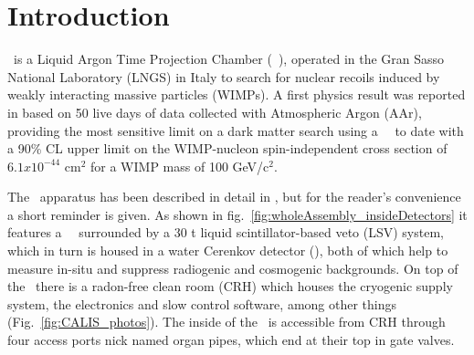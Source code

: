 \section{Introduction}\label{sec:intro}\label{sec:introduction}

\dsf\ is a Liquid Argon Time Projection Chamber (\lar\ \tpc), operated in the Gran Sasso National Laboratory (LNGS) in Italy to search for nuclear recoils induced by weakly interacting massive particles (WIMPs). A first physics result was reported in \cite{ds:ds-50:firstpaper} based on 50 live days of data collected with Atmospheric Argon (AAr), providing the most sensitive limit on a dark matter search using a \lar\ \tpc\ to date with a 90\% CL upper limit on the WIMP-nucleon spin-independent cross section of $6.1 x 10^{-44}$ cm$^2$ for a WIMP mass of 100 GeV/c$^2$.  %

The \dsf\ apparatus has been described in detail in \cite{ds:ds-50:firstpaper}, but for the reader's convenience a short reminder is given. As shown in fig.~\ref{fig:wholeAssembly_insideDetectors} it features a \lar\ \tpc\ surrounded by a 30 t liquid scintillator-based veto (LSV) system, which in turn is housed in a water Cerenkov detector (\wcd), both of which help to measure in-situ and suppress radiogenic and cosmogenic backgrounds. On top of the \wcd\ there is a radon-free clean room (CRH) which houses the cryogenic supply system, the electronics and slow control software, among other things (Fig.~\ref{fig:CALIS_photos}). The inside of the \lsv\ is accessible from CRH through four access ports nick named organ pipes, which end at their top in gate valves. 


